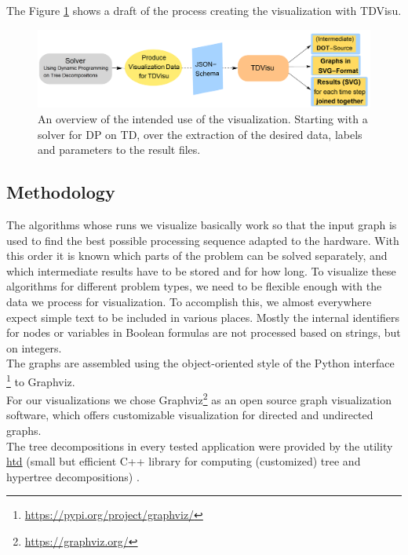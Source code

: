 \documentclass[a4paper, 12pt, bibliography=totoc]{scrartcl}
\begin{document}
The Figure \ref{fig:overviewprog} shows a draft of the process creating the visualization with TDVisu.

\begin{figure}
	\centering
		\includegraphics[width=1\linewidth]{images/OverviewProgram.png}
		
	\caption{An overview of the intended use of the visualization. Starting with a solver for DP on TD, over the extraction of the desired data, labels and parameters to the result files.}
	\label{fig:overviewprog}
\end{figure}


\subsection{Methodology}

The algorithms whose runs we visualize basically work so that the input graph is used to find the best possible processing sequence adapted to the hardware.
With this order it is known which parts of the problem can be solved separately, and which intermediate results have to be stored and for how long. To visualize these algorithms for different problem types, we need to be flexible enough with the data we process for visualization. To accomplish this, we almost everywhere expect simple text to be included in various places. Mostly the internal identifiers for nodes or variables in Boolean formulas are not processed based on strings, but on integers.\\

The graphs are assembled using the object-oriented style of the Python interface \footnote{\url{https://pypi.org/project/graphviz/}} to Graphviz.\\

For our visualizations we chose {Graphviz}\footnote{\url{https://graphviz.org/}} as an open source graph visualization software, which offers customizable visualization for directed and undirected graphs.\\

The tree decompositions in every tested application were provided by the utility \href{https://github.com/mabseher/htd}{htd} (small but efficient C++ library for computing (customized) tree and hypertree decompositions) \cite{htd}.\\
\end{document}
